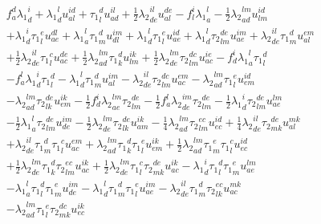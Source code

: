 \begin{gather*}
f^{d}_{a} {\lambda_1}^{i}_{d}
+ {\lambda_1}^{l}_{d} u^{id}_{al}
+ {\tau_1}^{d}_{l} u^{il}_{ad}
+ \frac{1}{2}{\lambda_2}^{il}_{de} u^{de}_{al}
- f^{i}_{l} {\lambda_1}^{l}_{a}
- \frac{1}{2}{\lambda_2}^{lm}_{ad} u^{id}_{lm} \\
+ {\lambda_1}^{i}_{d}   {\tau_1}^{e}_{l} u^{dl}_{ae}
+ {\lambda_1}^{l}_{a}   {\tau_1}^{d}_{m} u^{im}_{dl}
+ {\lambda_1}^{l}_{d}   {\tau_1}^{e}_{l} u^{id}_{ae}
+ {\lambda_1}^{l}_{d}   {\tau_2}^{de}_{lm} u^{im}_{ae}
+ {\lambda_2}^{il}_{de} {\tau_1}^{d}_{m} u^{em}_{al} \\
+ \frac{1}{2}{\lambda_2}^{il}_{de} {\tau_1}^{c}_{l} u^{de}_{ac}
+ \frac{1}{2}{\lambda_2}^{lm}_{ad} {\tau_1}^{d}_{k} u^{ik}_{lm}
+ \frac{1}{2}{\lambda_2}^{lm}_{de} {\tau_2}^{dc}_{lm} u^{ie}_{ac}
- f^{i}_{d} {\lambda_1}^{l}_{a} {\tau_1}^{d}_{l} \\
- f^{l}_{a} {\lambda_1}^{i}_{d} {\tau_1}^{d}_{l}
- {\lambda_1}^{l}_{d}   {\tau_1}^{d}_{m} u^{im}_{al}
- {\lambda_2}^{il}_{de} {\tau_2}^{dc}_{lm} u^{em}_{ac}
- {\lambda_2}^{lm}_{ad} {\tau_1}^{e}_{l} u^{id}_{em} \\
- {\lambda_2}^{lm}_{ad} {\tau_2}^{de}_{lk} u^{ik}_{em}
- \frac{1}{2}f^{i}_{d}   {\lambda_2}^{lm}_{ae} {\tau_2}^{de}_{lm}
- \frac{1}{2}f^{l}_{a}   {\lambda_2}^{im}_{de} {\tau_2}^{de}_{lm}
- \frac{1}{2}{\lambda_1}^{i}_{d} {\tau_2}^{de}_{lm} u^{lm}_{ae} \\
- \frac{1}{2}{\lambda_1}^{l}_{a} {\tau_2}^{de}_{lm} u^{im}_{de}
- \frac{1}{2}{\lambda_2}^{lm}_{de} {\tau_2}^{de}_{lk} u^{ik}_{am}
- \frac{1}{4}{\lambda_2}^{lm}_{ad} {\tau_2}^{ec}_{lm} u^{id}_{ec}
+ \frac{1}{4}{\lambda_2}^{il}_{de} {\tau_2}^{de}_{mk} u^{mk}_{al} \\
+ {\lambda_2}^{il}_{de} {\tau_1}^{d}_{m} {\tau_1}^{c}_{l} u^{em}_{ac}
+ {\lambda_2}^{lm}_{ad} {\tau_1}^{d}_{k} {\tau_1}^{e}_{l} u^{ik}_{em}
+ \frac{1}{2}{\lambda_2}^{lm}_{ad} {\tau_1}^{e}_{m} {\tau_1}^{c}_{l} u^{id}_{ec} \\
+ \frac{1}{2}{\lambda_2}^{lm}_{de} {\tau_1}^{d}_{k} {\tau_2}^{ec}_{lm} u^{ik}_{ac}
+ \frac{1}{2}{\lambda_2}^{lm}_{de} {\tau_1}^{c}_{l} {\tau_2}^{de}_{mk} u^{ik}_{ac}
- {\lambda_1}^{i}_{d}   {\tau_1}^{d}_{l} {\tau_1}^{e}_{m} u^{lm}_{ae} \\
- {\lambda_1}^{l}_{a}   {\tau_1}^{d}_{l} {\tau_1}^{e}_{m} u^{im}_{de}
- {\lambda_1}^{l}_{d}   {\tau_1}^{d}_{m} {\tau_1}^{e}_{l} u^{im}_{ae}
- {\lambda_2}^{il}_{de} {\tau_1}^{d}_{m} {\tau_2}^{ec}_{lk} u^{mk}_{ac} \\
- {\lambda_2}^{lm}_{ad} {\tau_1}^{e}_{l} {\tau_2}^{dc}_{mk} u^{ik}_{ec}

\end{gather*}
